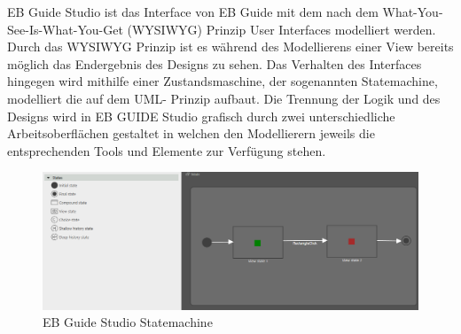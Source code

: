EB Guide Studio ist das Interface von EB Guide mit dem nach dem What-You-See-Is-What-You-Get (WYSIWYG) Prinzip User Interfaces modelliert werden. 
Durch das WYSIWYG Prinzip ist es während des Modellierens einer View bereits möglich das Endergebnis des Designs zu sehen.
Das Verhalten des Interfaces hingegen wird mithilfe einer Zustandsmaschine, der sogenannten Statemachine, modelliert die auf dem UML- Prinzip aufbaut.
Die Trennung der Logik und des Designs wird in EB GUIDE Studio grafisch durch zwei unterschiedliche Arbeitsoberflächen gestaltet in welchen den Modellierern jeweils die entsprechenden Tools und Elemente zur Verfügung stehen.

\begin{figure} [H]
\begin{center}
  \includegraphics[scale=0.4]{figures/Guide_Statemachine.PNG}
  \caption{EB Guide Studio Statemachine}
  \label{fig:Guide_Statemachine}
\end{center}
\end{figure}


